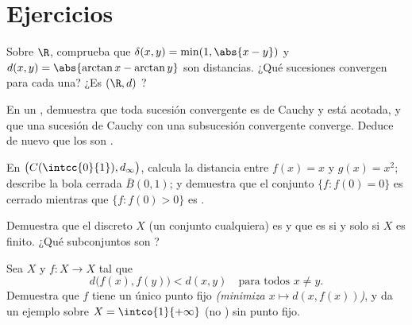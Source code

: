 \section{Ejercicios}

\begin{exercise}[$\star$]\label{exo:b2:metric:1}
Sobre $\R$, comprueba que $\delta(x, y) = \min(1, \abs{x - y})$ y
$d(x,y) = \abs{\arctan x - \arctan y}$ son distancias. ¿Qué
sucesiones convergen para cada una? ¿Es $(\R, d)$ ?
\end{exercise}

\begin{exercise}[$\star$]\label{exo:b2:metric:2}
En un , demuestra que toda sucesión convergente es de
Cauchy y está acotada, y que una sucesión de Cauchy con una
subsucesión convergente converge. Deduce de nuevo que los
 son .
\end{exercise}

\begin{exercise}[$\star$]\label{exo:b2:metric:3}
En $\bigl(C(\intcc{0}{1}), d_\infty\bigr)$, calcula la distancia
entre $f(x) = x$ y $g(x) = x^2$; describe la bola cerrada $\overline
B(0, 1)$; y demuestra que el conjunto $\{f : f(0) = 0\}$ es cerrado
mientras que $\{f : f(0) > 0\}$ es .
\end{exercise}

\begin{exercise}[$\star\star$]\label{exo:b2:metric:4}
Demuestra que el  discreto $X$ (un conjunto
cualquiera) es  y que es  si y solo si $X$ es
finito. ¿Qué subconjuntos son ?
\end{exercise}

\begin{exercise}[$\star\star$]\label{exo:b2:metric:5}
Sea $X$  y $f \colon X \to X$ tal que
\[
d\bigl(f(x), f(y)\bigr) < d(x, y) \quad \text{para todos } x \neq y .
\]
Demuestra que $f$ tiene un único punto fijo \emph{(minimiza $x
\mapsto d(x, f(x))$)}, y da un ejemplo sobre $X =
\intco{1}{+\infty}$ (no ) sin punto fijo.
\end{exercise}

